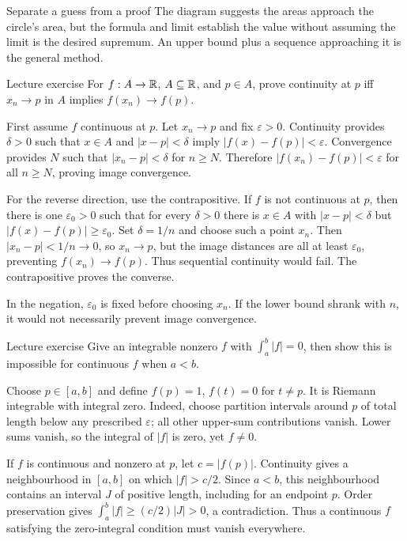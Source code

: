 \begin{note}{Separate a guess from a proof}
The diagram suggests the areas approach the circle's area, but the formula and limit establish the value without assuming the limit is the desired supremum. An upper bound plus a sequence approaching it is the general method.
\end{note}
\begin{exam}{Lecture exercise}
For $f:A\to\mathbb R$, $A\subseteq\mathbb R$, and $p\in A$, prove continuity at $p$ iff $x_n\to p$ in $A$ implies $f(x_n)\to f(p)$.
\end{exam}
\begin{answer}
First assume $f$ continuous at $p$. Let $x_n\to p$ and fix $\varepsilon>0$. Continuity provides $\delta>0$ such that $x\in A$ and $|x-p|<\delta$ imply $|f(x)-f(p)|<\varepsilon$. Convergence provides $N$ such that $|x_n-p|<\delta$ for $n\ge N$. Therefore $|f(x_n)-f(p)|<\varepsilon$ for all $n\ge N$, proving image convergence.

For the reverse direction, use the contrapositive. If $f$ is not continuous at $p$, then there is one $\varepsilon_0>0$ such that for every $\delta>0$ there is $x\in A$ with $|x-p|<\delta$ but $|f(x)-f(p)|\ge\varepsilon_0$. Set $\delta=1/n$ and choose such a point $x_n$. Then $|x_n-p|<1/n\to0$, so $x_n\to p$, but the image distances are all at least $\varepsilon_0$, preventing $f(x_n)\to f(p)$. Thus sequential continuity would fail. The contrapositive proves the converse.
\end{answer}
\begin{tip}
In the negation, $\varepsilon_0$ is fixed before choosing $x_n$. If the lower bound shrank with $n$, it would not necessarily prevent image convergence.
\end{tip}
\begin{exam}{Lecture exercise}
Give an integrable nonzero $f$ with $\int_a^b|f|=0$, then show this is impossible for continuous $f$ when $a<b$.
\end{exam}
\begin{answer}
Choose $p\in[a,b]$ and define $f(p)=1$, $f(t)=0$ for $t\ne p$. It is Riemann integrable with integral zero. Indeed, choose partition intervals around $p$ of total length below any prescribed $\varepsilon$; all other upper-sum contributions vanish. Lower sums vanish, so the integral of $|f|$ is zero, yet $f\ne0$.

If $f$ is continuous and nonzero at $p$, let $c=|f(p)|$. Continuity gives a neighbourhood in $[a,b]$ on which $|f|>c/2$. Since $a<b$, this neighbourhood contains an interval $J$ of positive length, including for an endpoint $p$. Order preservation gives $\int_a^b|f|\ge(c/2)|J|>0$, a contradiction. Thus a continuous $f$ satisfying the zero-integral condition must vanish everywhere.
\end{answer}
